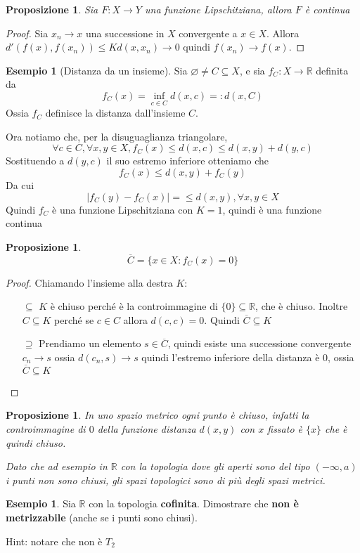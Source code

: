 \documentclass{article}
\newcounter{theo}[section]\setcounter{theo}{0}
\newcounter{excounter}[section]\setcounter{excounter}{0}
\theoremstyle{plain}
\newtheorem{proposition}[theo]{Proposizione}
\theoremstyle{definition}
\newtheorem{example}[excounter]{Esempio}
\theoremstyle{remark}
\begin{document}
\begin{proposition}
    Sia \(F : X \to Y\) una funzione Lipschitziana, allora \(F\) è continua
\end{proposition}
\begin{proof}
    Sia \(x_{n} \to x\) una successione in \(X\) convergente a \(x \in X\).
    Allora \(d'(f(x), f(x_{n})) \le Kd(x, x_{n}) \to 0\) quindi \(f(x_{n}) \to
    f(x)\).
\end{proof}

\begin{example}[Distanza da un insieme]
    Sia \(\varnothing \neq C \subseteq  X\), e sia \(f_C : X \to \mathbb{R}\)
    definita da \[f_C(x) = \inf_{c \in C} d(x, c) =: d(x, C)\] 
    Ossia \(f_C\) definisce la distanza dall'insieme \(C\).

    Ora notiamo che, per la disuguaglianza triangolare,
    \[
        \forall c \in  C, \forall x, y \in X, f_C(x) \le d(x, c) \le d(x, y) +
        d(y, c)
    \]
    Sostituendo a \(d(y, c)\) il suo estremo inferiore otteniamo che
    \[
        f_C(x) \le d(x, y) + f_C(y)
    \]
    Da cui
    \[
        |f_C(y) - f_C(x)| = \le d(x, y), \forall x, y \in X
    \]
    Quindi \(f_C\) è una funzione Lipschitziana con \(K = 1\), quindi è una
    funzione continua
\end{example}

\begin{proposition}
    \[
        \overline{C} = \{x \in X : f_C(x) = 0\} 
    \]
\end{proposition}
\begin{proof}
    Chiamando l'insieme alla destra \(K\):
\begin{itemize}[label = --]
    \item[\(\subseteq  \) ] \(K\) è chiuso perché è la controimmagine di \(\{0\} \subseteq
        \mathbb{R}\), che è chiuso. Inoltre \(C \subseteq  K\) perché se \(c \in
        C\) allora \(d(c, c) = 0\). Quindi \(\overline{C} \subseteq  K\) 
    \item[\(\supseteq  \) ] Prendiamo un elemento \(s \in \overline{C}\), quindi esiste una
        successione convergente \(c_n \to  s\) ossia \(d(c_n, s) \to s\) quindi
        l'estremo inferiore della distanza è \(0\), ossia \(\overline{C}
        \subseteq  K\) 
\end{itemize}
\end{proof}

\begin{proposition}
    In uno spazio metrico ogni punto è chiuso, infatti la controimmagine di
    \(0\) della funzione distanza \(d(x, y)\) con \(x\) fissato è \(\{x\}\) che
    è quindi chiuso.

    Dato che ad esempio in \(\mathbb{R}\) con la topologia dove gli aperti sono del
    tipo \((-\infty, a)\) i punti non sono chiusi, gli spazi topologici sono di
    più degli spazi metrici.
\end{proposition}
\begin{example}
    Sia \(\mathbb{R}\) con la topologia \textbf{cofinita}. Dimostrare che
    \textbf{non è metrizzabile} (anche se i punti sono chiusi).

    Hint: notare che non è \(T_{2}\) 
\end{example}
\end{document}
